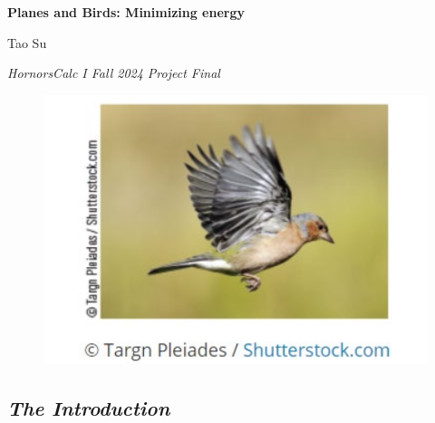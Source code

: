 \documentclass{article}
\begin{document}
\begin{titlepage}
    \centering
    \vspace*{1cm}
    
    \Huge
    \textbf{Planes and Birds: Minimizing energy}
    
    \vspace{0.5cm}
    
    \Large
    Tao Su
    
    \vspace{1.5cm}
    
    \large 
    \textit{HornorsCalc I Fall 2024 Project Final}
    
    \vfill

    \begin{figure}[h]
        \centering
        \includegraphics[width=1\textwidth]{coverPage.png}
    \end{figure}
\end{titlepage}

\newpage

\subsection*{\itshape \large The Introduction}
\end{document}
